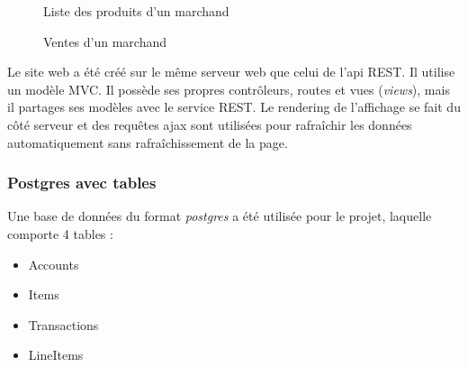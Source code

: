 		\begin{figure}[p]
			\caption{Liste des produits d’un marchand}
			\label{fig.prodMarchands}
		\end{figure}

		\begin{figure}[p]
			\caption{Ventes d’un marchand}
			\label{fig.ventesMarchands}
		\end{figure}

		Le site web a été créé sur le même serveur web que celui de l’api REST. Il utilise un modèle MVC. Il possède ses propres contrôleurs, routes et vues (\emph{views}), mais il partages ses modèles avec le service REST. Le \og rendering \fg{} de l’affichage se fait du côté serveur et des requêtes ajax sont utilisées pour rafraîchir les données automatiquement sans rafraîchissement de la page.
		
		\subsubsection{Postgres avec tables}
		Une base de données du format \emph{postgres} a été utilisée pour le projet, laquelle comporte 4 tables : 
		\begin{itemize}
			\item Accounts
			\item Items
			\item Transactions
			\item LineItems
		\end{itemize}

